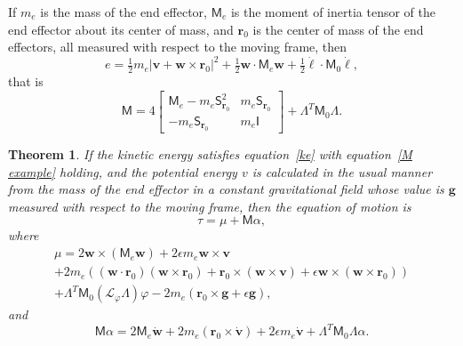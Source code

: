 \documentclass[reqno,12pt]{amsart}
\newcommand\starop[1]{\mathsf S_{#1}}
\newcommand{\liederiv}{\mathcal L}
\newtheorem{theorem}{Theorem}
\begin{document}
If $m_e$ is the mass of the end effector, $\mathsf M_e$ is the moment of inertia tensor of the end effector about its center of mass, and $\bm r_0$ is the center of mass of the end effectors, all measured with respect to the moving frame, then
\begin{equation}
\label{ke written in full}
e = \tfrac12 m_e |\bm v + \bm w \times \bm r_0|^2 + \tfrac12 \bm w \cdot \mathsf M_e \bm w + \tfrac12 \dot{\bm\ell} \cdot \mathsf M_0 \dot{\bm\ell} , 
\end{equation}
that is
\begin{equation}
\label{M example}
\mathsf M = 4 \begin{bmatrix} \mathsf M_e - m_e \starop{\bm r_0}^2 & m_e \starop{\bm r_0} \\ - m_e \starop{\bm r_0} & m_e \mathsf I \end{bmatrix} + \mathsf\Lambda^T \mathsf M_0 \mathsf\Lambda.
\end{equation}

\begin{theorem}
\label{equation of motion}
If the kinetic energy satisfies equation~\eqref{ke} with equation~\eqref{M example} holding, and the potential energy $v$ is calculated in the usual manner from the mass of the end effector in a constant gravitational field whose value is $\bm g$ measured with respect to the moving frame, then the equation of motion is
\begin{equation}
\tau = \mu + \mathsf M \alpha,
\end{equation}
where
\begin{multline}
\label{tau example}
\mu = 2\bm w \times (\mathsf M_e \bm w) + 2\epsilon m_e \bm w \times \bm v \\
+ 2 m_e ((\bm w \cdot \bm r_0) (\bm w \times \bm r_0) + \bm r_0 \times (\bm w \times \bm v) + \epsilon \bm w \times (\bm w \times \bm r_0)) \\
+ \mathsf \Lambda^T \mathsf M_0 (\liederiv_\varphi \mathsf \Lambda) \varphi 
- 2 m_e (\bm r_0 \times \bm g + \epsilon \bm g) ,
\end{multline}
and
\begin{equation}
\mathsf M \alpha = 2 \mathsf M_e \dot{\bm w} + 2 m_e (\bm r_0 \times \dot{\bm v}) + 2 \epsilon m_e \dot{\bm v} + \mathsf\Lambda^T \mathsf M_0 \mathsf \Lambda \alpha.
\end{equation}
\end{theorem}
\end{document}
